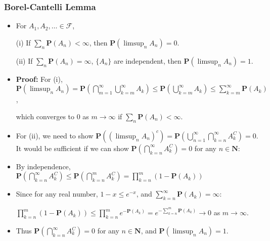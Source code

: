 \documentclass[handout]{beamer}
\newcommand{\BP}{\mathbf{P}}
\begin{document}
\frame
{
  \frametitle{Borel-Cantelli Lemma}

   \begin{itemize}


\item<1->[] \begin{Theorem} For $A_1,A_2,\ldots \in \mathcal{F}$, 
                       
(i) If $\sum_n \BP(A_n)<\infty$, then $\BP(\limsup_n A_n)=0$. 
                      
(ii) If $\sum_n \BP(A_n)=\infty$, $\{A_n\}$ are independent, then $\BP(\limsup_n A_n)=1$. 
                      

\end{Theorem}
                           
               \item<2->  \textbf{Proof:} For (i), 
        $\BP(\limsup_n A_n)= \BP(\bigcap_{m=1}^{\infty}\bigcup_{k=m}^{\infty} A_k) \leq \BP(\bigcup_{k=m}^{\infty} A_k) \leq \sum_{k=m}^{\infty} \BP(A_k)$,
        
       which converges to $0$ as $m\rightarrow \infty$ if $\sum_n \BP(A_n)<\infty$.       
       
       \item<3->[] For (ii), we need to show  $\BP((\limsup_n A_n)^c)=\BP(\bigcup_{n=1}^{\infty} \bigcap_{k=n}^{\infty} A_k^C)=0$. It would be sufficient if we can show $\BP( \bigcap_{k=n}^{\infty} A_k^C)=0$ for any $n\in \mathbf{N}$:
       
      \item<4->[] By independence,  $\BP( \bigcap_{k=n}^{\infty} A_k^C)\leq \BP( \bigcap_{k=n}^{m} A_k^C)=\prod_{k=n}^m (1-\BP(A_k))$
      
            \item<5->[] Since for any real number, $1-x\leq e^{-x}$, and $\sum_{k=n}^{\infty} \BP(A_k)=\infty$:
            
            $\prod_{k=n}^m (1-\BP(A_k))\leq \prod_{k=n}^m e^{-\BP(A_k)}=e^{-\sum_{k=n}^m \BP(A_k)}\rightarrow 0$  as $m\rightarrow \infty$.
       
       
            \item<6->[] Thus $\BP( \bigcap_{k=n}^{\infty} A_k^C)=0$ for any $n\in \mathbf{N}$, and $\BP(\limsup_n A_n)=1$.
                
                             
                    \end{itemize}
}
\end{document}
